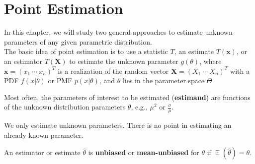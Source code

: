 \documentclass{huhtakm-template-book-v2}
\DeclareMathOperator{\E}{\mathbb{E}}
\begin{document}
\chapter{Point Estimation}
    In this chapter, we will study two general approaches to estimate unknown parameters of any given parametric distribution.\\
    The basic idea of point estimation is to use a statistic $T$, an estimate $T(\mathbf{x})$, or an estimator $T(\mathbf{X})$ to estimate the unknown parameter $g(\theta)$, where $\mathbf{x} = (x_{1}\ \cdots\ x_{n})^{T}$ is a realization of the random vector $\mathbf{X} = (X_{1}\ \cdots\ X_{n})^{T}$ with a PDF $f(x | \theta)$ or PMF $p(x | \theta)$, and $\theta$ lies in the parameter space $\Theta$.
    \begin{rem}
        Most often, the parameters of interest to be estimated (\textbf{estimand}) are functions of the unknown distribution parameters $\theta$, e.g., $\mu^{2}$ or $\frac{\sigma}{\mu}$.
    \end{rem}
    \begin{rem}
        We only estimate unknown parameters. There is no point in estimating an already known parameter.
    \end{rem}
    \begin{defn}
        An estimator or estimate $\hat{\theta}$ is \textbf{unbiased} or \textbf{mean-unbiased} for $\theta$ if $\E(\hat{\theta}) = \theta$.
    \end{defn}
    
\end{document}
